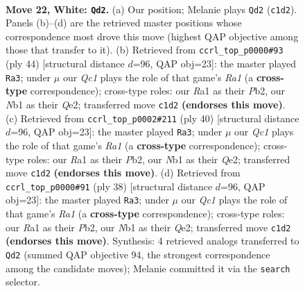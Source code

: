 \documentclass[11pt]{article}
\begin{document}
\clearpage

\begin{figure}[p]\centering
\begin{subfigure}{0.46\textwidth}\centering
\resizebox{\linewidth}{!}{%
\newchessgame
\chessboard[
  setfen={rnb1k1r1/8/4q3/p2p1ppp/1p1B4/8/PPP2PPP/RNQ3KR w q - 0 22},
  showmover=false,
  pgfstyle=straightmove, color=movearrow, markmove={c1-d2}
]}
\caption{}
\end{subfigure}\hfill
\begin{subfigure}{0.46\textwidth}\centering
\resizebox{\linewidth}{!}{%
\newchessgame
\chessboard[
  setfen={1r2qr1k/3b1ppp/3p4/3Np1b1/pPB1P3/8/1P2QPPP/R4RK1 w - - 11 23},
  showmover=false,
  pgfstyle=straightmove, color=movearrow, markmove={a1-a3}
]}
\caption{}
\end{subfigure}
\\[4pt]
\begin{subfigure}{0.46\textwidth}\centering
\resizebox{\linewidth}{!}{%
\newchessgame
\chessboard[
  setfen={1r2qr1k/3b1ppp/3p4/3Np1b1/pPB1P3/8/1P2QPPP/R4RK1 w - - 7 21},
  showmover=false,
  pgfstyle=straightmove, color=movearrow, markmove={a1-a3}
]}
\caption{}
\end{subfigure}\hfill
\begin{subfigure}{0.46\textwidth}\centering
\resizebox{\linewidth}{!}{%
\newchessgame
\chessboard[
  setfen={1r2qr1k/3b1ppp/3p4/3Np1b1/pPB1P3/8/1P2QPPP/R4RK1 w - - 7 20},
  showmover=false,
  pgfstyle=straightmove, color=movearrow, markmove={a1-a3}
]}
\caption{}
\end{subfigure}
\caption{\textbf{Move 22, White: \texttt{Qd2}.} (a) Our position; Melanie plays \texttt{Qd2} (\texttt{c1d2}). Panels (b)--(d) are the retrieved master positions whose correspondence most drove this move (highest QAP objective among those that transfer to it). (b) Retrieved from \texttt{ccrl\_top\_p0000\#93} (ply 44) [structural distance $d$=96, QAP obj=23]: the master played \texttt{Ra3}; under $\mu$ our \emph{Qc1} plays the role of that game's \emph{Ra1} (a \textbf{cross-type} correspondence); cross-type roles: our \emph{R}a1 as their \emph{P}b2, our \emph{N}b1 as their \emph{Q}e2; transferred move \texttt{c1d2} \textbf{(endorses this move)}. (c) Retrieved from \texttt{ccrl\_top\_p0002\#211} (ply 40) [structural distance $d$=96, QAP obj=23]: the master played \texttt{Ra3}; under $\mu$ our \emph{Qc1} plays the role of that game's \emph{Ra1} (a \textbf{cross-type} correspondence); cross-type roles: our \emph{R}a1 as their \emph{P}b2, our \emph{N}b1 as their \emph{Q}e2; transferred move \texttt{c1d2} \textbf{(endorses this move)}. (d) Retrieved from \texttt{ccrl\_top\_p0000\#91} (ply 38) [structural distance $d$=96, QAP obj=23]: the master played \texttt{Ra3}; under $\mu$ our \emph{Qc1} plays the role of that game's \emph{Ra1} (a \textbf{cross-type} correspondence); cross-type roles: our \emph{R}a1 as their \emph{P}b2, our \emph{N}b1 as their \emph{Q}e2; transferred move \texttt{c1d2} \textbf{(endorses this move)}. Synthesis: 4 retrieved analogs transferred to \texttt{Qd2} (summed QAP objective 94, the strongest correspondence among the candidate moves); Melanie committed it via the \texttt{search} selector.}
\label{fig:thought-m42}
\end{figure}
\end{document}
